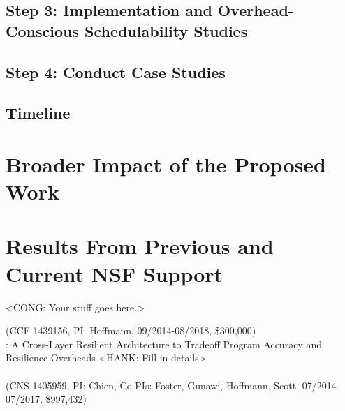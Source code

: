 \documentclass[10pt,letterpaper]{article}
\begin{document}
\subsection{Step 3: Implementation and Overhead-Conscious Schedulability Studies}
\label{sec:step3}



\subsection{Step 4: Conduct Case Studies}
\label{sec:step4}



\subsection{Timeline}
\label{sec:timeline}



\section{Broader Impact of the Proposed Work}
\label{sec:impact}




\section{Results From Previous and Current NSF Support}
\label{sec:prior} 

<CONG: Your stuff goes here.>


\vspace{0.05cm}

 (CCF 1439156, PI: Hoffmann, 09/2014-08/2018, \$300,000)\\
: A Cross-Layer Resilient Architecture to Tradeoff Program Accuracy and Resilience Overheads <HANK: Fill in details>\\
 \\
 (CNS 1405959, PI: Chien, Co-PIs: Foster, Gunawi, Hoffmann, Scott, 07/2014-07/2017, \$997,432) 
\end{document}
